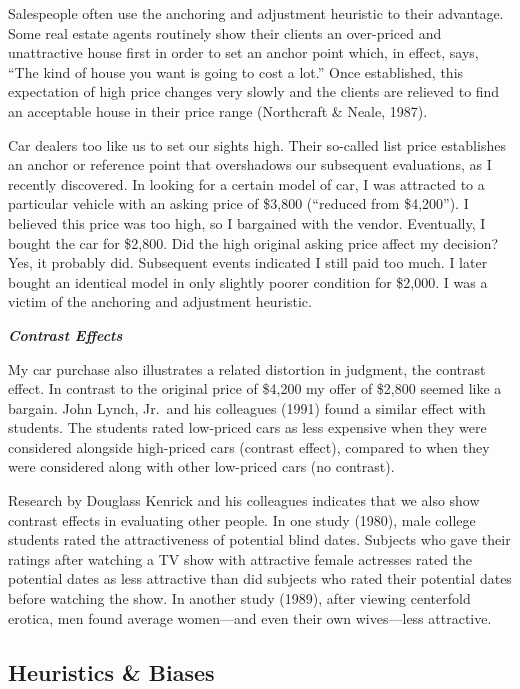 \documentclass[
]{book}
\begin{document}
Salespeople often use the anchoring and adjustment heuristic to their advantage. Some real estate agents routinely show their clients an over-priced and unattractive house first in order to set an anchor point which, in effect, says, ``The kind of house you want is going to cost a lot.'' Once established, this expectation of high price changes very slowly and the clients are relieved to find an acceptable house in their price range (Northcraft \& Neale, 1987).

Car dealers too like us to set our sights high. Their so-called list price establishes an anchor or reference point that overshadows our subsequent evaluations, as I recently discovered. In looking for a certain model of car, I was attracted to a particular vehicle with an asking price of \$3,800 (``reduced from \$4,200''). I believed this price was too high, so I bargained with the vendor. Eventually, I bought the car for \$2,800. Did the high original asking price affect my decision? Yes, it probably did. Subsequent events indicated I still paid too much. I later bought an identical model in only slightly poorer condition for \$2,000. I was a victim of the anchoring and adjustment heuristic.

\textbf{\emph{Contrast Effects}}

My car purchase also illustrates a related distortion in judgment, the contrast effect. In contrast to the original price of \$4,200 my offer of \$2,800 seemed like a bargain. John Lynch, Jr.~and his colleagues (1991) found a similar effect with students. The students rated low-priced cars as less expensive when they were considered alongside high-priced cars (contrast effect), compared to when they were considered along with other low-priced cars (no contrast).

Research by Douglass Kenrick and his colleagues indicates that we also show contrast effects in evaluating other people. In one study (1980), male college students rated the attractiveness of potential blind dates. Subjects who gave their ratings after watching a TV show with attractive female actresses rated the potential dates as less attractive than did subjects who rated their potential dates before watching the show. In another study (1989), after viewing centerfold erotica, men found average women---and even their own wives---less attractive.

\hypertarget{heuristics-biases}{%
\subsection*{Heuristics \& Biases}\label{heuristics-biases}}
\end{document}
